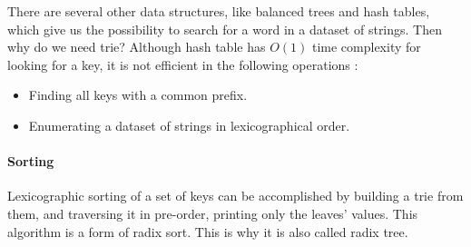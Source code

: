 \documentclass[data-structure.tex]{subfiles}
\begin{document}
 
 
         
 
 
 
 
 
 
 
There are several other data structures, like balanced trees and hash tables, which give us the possibility to search for a word in a dataset of strings. Then why do we need trie? Although hash table has $O(1)$ time complexity for looking for a key, it is not efficient in the following operations :
\begin{itemize}
    \item Finding all keys with a common prefix.
    \item Enumerating a dataset of strings in lexicographical order.
\end{itemize}

\paragraph{Sorting}
Lexicographic sorting of a set of keys can be accomplished by building a trie from them, and traversing it in pre-order, printing only the leaves' values. This algorithm is a form of radix sort. This is why it is also called radix tree. 

\end{document}
